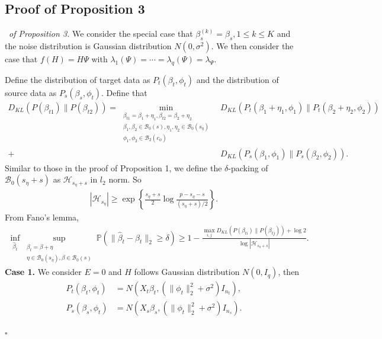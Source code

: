 \documentclass[12pt]{article}
\newenvironment{pf}{{\noindent \it Proof}\ }{\hfill $\square$\par}
\begin{document}
\subsection{Proof of Proposition 3}
\begin{pf}{\it of Proposition 3. }
    We consider the special case that $\beta_s^{(k)} = \beta_s,1\le k\le K$ and the noise distribution is Gaussian distribution $N(0,\sigma^2)$. We then consider the case that $f(H)= H\Psi$ with $\lambda_1(\Psi) = \cdots = \lambda_q(\Psi) = \lambda_\Psi$. 

    Define the distribution of target data as $P_t(\beta_t,\phi_t)$ and the distribution of source data as $P_s(\beta_s,\phi_t)$. Define that 
    \begin{align*}
        D_{KL}(P(\beta_{t1})\|P(\beta_{t2})) = \underset{\substack{\beta_{t1}=\beta_1+\eta_1,\beta_{t2}=\beta_2+\eta_2\\\beta_1,\beta_2\in \mathcal{B}_0(s),\eta_1,\eta_2\in \mathcal{B}_0(s_\eta)\\\phi_1,\phi_2\in\mathcal{B}_2(c_\phi)}}{\min} &D_{KL} (P_t(\beta_1+\eta_1,\phi_1)\|P_t(\beta_2+\eta_2,\phi_2)) \\+& D_{KL} (P_s(\beta_1,\phi_1)\|P_s(\beta_2,\phi_2)). 
    \end{align*}
Similar to those in the proof of Proposition 1, we define the $\delta$-packing of $\mathcal{B}_0(s_\eta+s)$ as $\mathcal{H}_{s_\eta+s}$ in $l_2$ norm. So 
    \begin{align*}
        \left|\mathcal{H}_{s_\eta}\right|\ge\exp\left\{\frac{s_\eta+s}{2}\log \frac{p-s_\eta-s}{(s_\eta+s)/2}\right\}.
    \end{align*}
    From Fano's lemma,
    \begin{align*}
        \inf_{\hat{\beta}_t}\underset{\substack{\beta_t=\beta+\eta\\\eta\in \mathcal{B}_0(s_\eta),\beta\in \mathcal{B}_0(s)}}{\sup}\mathbb{P}(\|\hat{\beta}_t-\beta_t\|_2 \ge \delta) \ge 1- \frac{\max_{i,j}D_{KL}(P(\beta_{ti})\|P(\beta_{tj})) +\log 2}{\log |\mathcal{H}_{s_\eta+s}|}. 
    \end{align*}
    \textbf{Case 1. }
    We consider $E = 0$ and $H$ follows Gaussian distribution $N(0,I_q)$, then 
    \begin{align*}
        P_t(\beta_t,\phi_t) &= N\left(X_t\beta_t,(\|\phi_t\|_2^2 + \sigma^2)I_{n_t}\right),\\
        P_s(\beta_s,\phi_t) &= N\left(X_s\beta_s,(\|\phi_t\|_2^2 + \sigma^2)I_{n_s}\right).
    \end{align*}

\end{pf}
\end{document}
